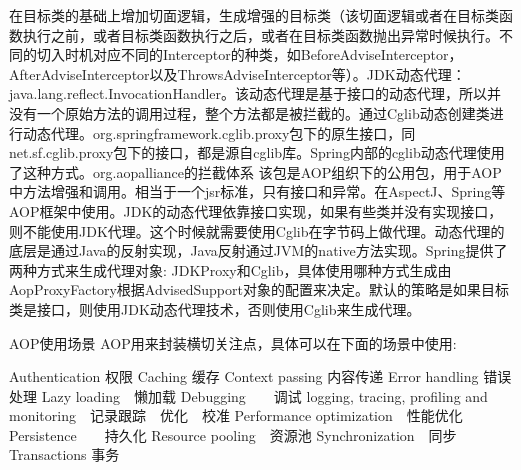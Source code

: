 \documentclass[../../../interview-questions.tex]{subfiles}
\begin{document}
在目标类的基础上增加切面逻辑，生成增强的目标类（该切面逻辑或者在目标类函数执行之前，或者目标类函数执行之后，或者在目标类函数抛出异常时候执行。不同的切入时机对应不同的Interceptor的种类，如BeforeAdviseInterceptor，AfterAdviseInterceptor以及ThrowsAdviseInterceptor等）。JDK动态代理：java.lang.reflect.InvocationHandler。该动态代理是基于接口的动态代理，所以并没有一个原始方法的调用过程，整个方法都是被拦截的。通过Cglib动态创建类进行动态代理。org.springframework.cglib.proxy包下的原生接口，同net.sf.cglib.proxy包下的接口，都是源自cglib库。Spring内部的cglib动态代理使用了这种方式。org.aopalliance的拦截体系
该包是AOP组织下的公用包，用于AOP中方法增强和调用。相当于一个jsr标准，只有接口和异常。在AspectJ、Spring等AOP框架中使用。JDK的动态代理依靠接口实现，如果有些类并没有实现接口，则不能使用JDK代理。这个时候就需要使用Cglib在字节码上做代理。动态代理的底层是通过Java的反射实现，Java反射通过JVM的native方法实现。Spring提供了两种方式来生成代理对象: JDKProxy和Cglib，具体使用哪种方式生成由AopProxyFactory根据AdvisedSupport对象的配置来决定。默认的策略是如果目标类是接口，则使用JDK动态代理技术，否则使用Cglib来生成代理。


AOP使用场景
AOP用来封装横切关注点，具体可以在下面的场景中使用:

Authentication 权限
Caching 缓存
Context passing 内容传递
Error handling 错误处理
Lazy loading　懒加载
Debugging　　调试
logging, tracing, profiling and monitoring　记录跟踪　优化　校准
Performance optimization　性能优化
Persistence　　持久化
Resource pooling　资源池
Synchronization　同步
Transactions 事务
\end{document}

